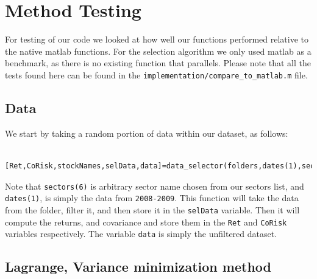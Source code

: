 \documentclass[12pt,titlepage,letter]{article}
\begin{document}
\section{Method Testing}

	\begin{par}
		For testing of our code we looked at how well our functions performed relative to the native matlab functions. For the selection algorithm we only used matlab as a benchmark, as there is no existing function that parallels. Please note that all the tests found here can be found in the \texttt{implementation/compare\_to\_matlab.m} file.
	\end{par} \vspace{1em}

	\subsection{Data}

	\begin{par}
		We start by taking a random portion of data within our dataset, as follows:
	\end{par}
	\begin{lstlisting}
		[Ret,CoRisk,stockNames,selData,data]=data_selector(folders,dates(1),sectors(6));
	\end{lstlisting}
	\begin{par}
		Note that \texttt{sectors(6)} is arbitrary sector name chosen from our sectors list, and \texttt{dates(1)}, is simply the data from \texttt{2008-2009}. This function will take the data from the folder, filter it, and then store it in the \texttt{selData} variable. Then it will compute the returns, and covariance and store them in the \texttt{Ret} and \texttt{CoRisk} variables respectively. The variable \texttt{data} is simply the unfiltered dataset.
	\end{par} \vspace{1em}

	\subsection{Lagrange, Variance minimization method}
\end{document}
